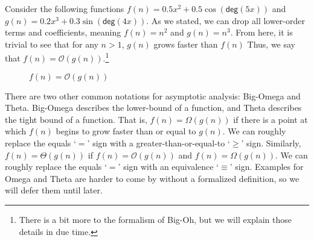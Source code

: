 \example Consider the following functions $f(n) = 0.5x^2 + 0.5\cos(\textsf{deg}(5x))$ and $g(n) = 0.2x^3 + 0.3\sin({\textsf{deg}(4x)})$. As we stated, we can drop all lower-order terms and coefficients, meaning $f(n) = n^2$ and $g(n) = n^3$. From here, it is trivial to see that for any $n > 1$, $g(n)$ grows faster than $f(n)$ Thus, we say that $f(n) = \mathcal{O}(g(n))$.\footnote{There is a bit more to the formalism of Big-Oh, but we will explain those details in due time.}
\begin{figure}[H]
  \centering
  \caption{$f(n) = \mathcal{O}(g(n))$}
  \end{figure}

There are two other common notations for asymptotic analysis: Big-Omega and Theta. Big-Omega describes the lower-bound of a function, and Theta describes the tight bound of a function. That is, $f(n) = \Omega(g(n))$ if there is a point at which $f(n)$ begins to grow faster than or equal to $g(n)$. We can roughly replace the equals `$=$' sign with a greater-than-or-equal-to `$\geq$' sign. Similarly, $f(n) = \Theta(g(n))$ if $f(n) = \mathcal{O}(g(n))$ and $f(n) = \Omega(g(n))$. We can roughly replace the equals `$=$' sign with an equivalence `$\equiv$' sign. Examples for Omega and Theta are harder to come by without a formalized definition, so we will defer them until later.

